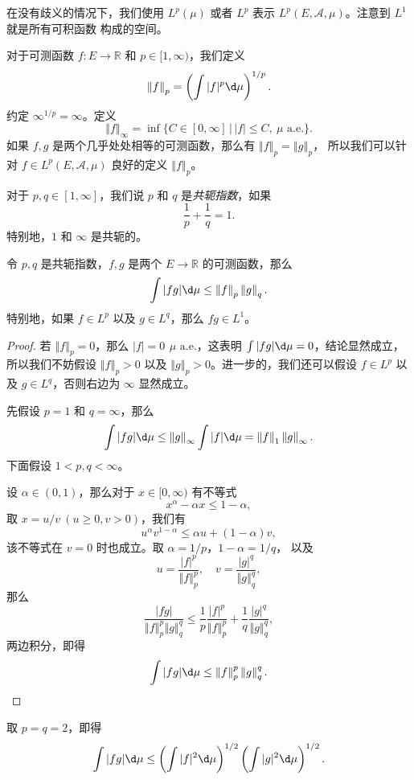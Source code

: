 \documentclass[fontset=none]{Notes}
\newcommand{\alev}[1]{\text{$#1$ a.e.}}
\newcommand{\norm}[1]{\left\Vert#1\right\Vert}
\begin{document}
在没有歧义的情况下，我们使用 $L^p(\mu)$ 或者 $L^p$ 表示
$L^p(E,\mathcal{A},\mu)$。注意到 $L^1$ 就是所有可积函数
构成的空间。

对于可测函数 $f:E\to \mathbb{R}$ 和 $p\in [1,\infty)$，我们定义
\[
  \norm{f}_p=\left(\int |f|^p\d\mu\right)^{1/p}  .
\]
约定 $\infty^{1/p}=\infty$。定义
\[
  \norm{f}_\infty=\inf\{C\in[0,\infty]\,|\, |f|\leq C,\ \alev{\mu}\}  .
\]
如果 $f,g$ 是两个几乎处处相等的可测函数，那么有 $\norm{f}_p=\norm{g}_p$，
所以我们可以针对 $f\in L^p(E,\mathcal{A},\mu)$ 良好的定义 $\norm{f}_p$。

对于 $p,q\in [1,\infty]$，我们说 $p$ 和 $q$ 是\emph{共轭指数}，如果
\[
  \frac{1}{p}+\frac{1}{q}=1.  
\]
特别地，$1$ 和 $\infty$ 是共轭的。

\begin{theorem}
  令 $p,q$ 是共轭指数，$f,g$ 是两个 $E\to \mathbb{R}$ 的可测函数，那么
  \[
    \int|fg|\d\mu\leq \norm{f}_p\norm{g}_q.  
  \]
  特别地，如果 $f\in L^p$ 以及 $g\in L^q$，那么
  $fg\in L^1$。
\end{theorem}
\begin{proof}
  若 $\norm{f}_p=0$，那么 $|f|=0\,\ \alev{\mu}$，这表明 
  $\int |fg|\d\mu=0$，结论显然成立，所以我们不妨假设
  $\norm{f}_p>0$ 以及 $\norm{g}_p>0$。进一步的，我们还可以假设
  $f\in L^p$ 以及 $g\in L^q$，否则右边为 $\infty$ 显然成立。

  先假设 $p=1$ 和 $q=\infty$，那么
  \[
    \int|fg|\d\mu\leq \norm{g}_{\infty}\int |f|\d\mu
    =  \norm{f}_1\norm{g}_\infty.
  \]
  下面假设 $1<p,q<\infty$。

  设 $\alpha\in (0,1)$，那么对于 $x\in [0,\infty)$ 有不等式
  \[
    x^\alpha-\alpha x\leq 1-\alpha,  
  \]
  取 $x=u/v\ (u\geq 0,v>0)$，我们有
  \[
    u^\alpha v^{1-\alpha}\leq \alpha u+(1-\alpha) v,  
  \]
  该不等式在 $v=0$ 时也成立。取 $\alpha=1/p$，$1-\alpha=1/q$，
  以及
  \[
    u=\frac{|f|^p}{\norm{f}_p^p} ,\quad v=\frac{|g|^q}{\norm{g}_q^q},
  \]
  那么
  \[
  \frac{|fg|}{\norm{f}_p^p\norm{g}_q^q}\leq
  \frac{1}{p}\frac{|f|^p}{\norm{f}_p^p}+
  \frac{1}{q}\frac{|g|^q}{\norm{g}_q^q},
  \]
  两边积分，即得
  \[
    \int|fg|\d\mu\leq   \norm{f}_p^p\norm{g}_q^q.\qedhere
  \]
\end{proof}

\begin{corollary}
  取 $p=q=2$，即得
  \[
    \int |fg|\d\mu\leq \left(\int |f|^2 \d\mu\right)^{1/2}  
    \left(\int |g|^2 \d\mu\right)^{1/2}  .
  \]
\end{corollary}
 
\end{document}
